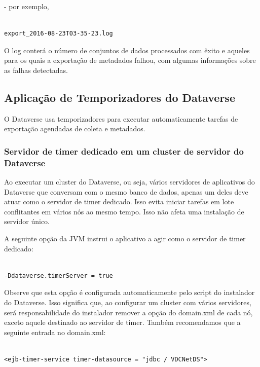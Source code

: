 \documentclass[12pt,hidelinks]{article}
\begin{document}
- por exemplo,

\begin{verbatim}

export_2016-08-23T03-35-23.log

\end{verbatim}
  
O log conterá o número de conjuntos de dados processados com êxito e aqueles para os quais a exportação de metadados falhou, com algumas informações sobre as falhas detectadas.


\subsection{Aplicação de Temporizadores do Dataverse}

\qquad O Dataverse usa temporizadores para executar automaticamente tarefas de exportação agendadas de coleta e metadados.

\subsubsection{Servidor de timer dedicado em um cluster de servidor do Dataverse}

\qquad Ao executar um cluster do Dataverse, ou seja, vários servidores de aplicativos do Dataverse que conversam com o mesmo banco de dados, apenas um deles deve atuar como o servidor de timer dedicado. Isso evita iniciar tarefas em lote conflitantes em vários nós ao mesmo tempo. Isso não afeta uma instalação de servidor único.

A seguinte opção da JVM instrui o aplicativo a agir como o servidor de timer dedicado:

\begin{verbatim}

-Ddataverse.timerServer = true

\end{verbatim}

Observe que esta opção é configurada automaticamente pelo script do instalador do Dataverse. Isso significa que, ao configurar um cluster com vários servidores, será responsabilidade do instalador remover a opção do domain.xml de cada nó, exceto aquele destinado ao servidor de timer. Também recomendamos que a seguinte entrada no domain.xml:

\begin{verbatim}

<ejb-timer-service timer-datasource = "jdbc / VDCNetDS"> 

\end{verbatim}
\end{document}
